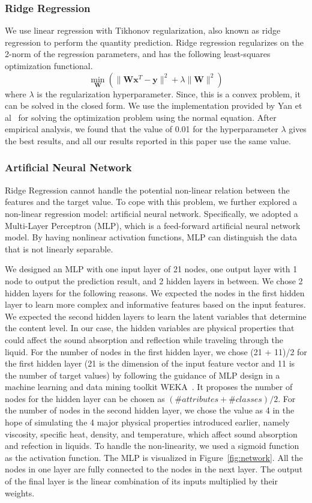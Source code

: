 \documentclass{article} %
\newcommand{\x}{\mathbf{x}}
\newcommand{\W}{\mathbf{W}}
\begin{document}
\subsubsection{Ridge Regression}
We use linear regression with Tikhonov regularization, also known as ridge regression to perform
the quantity prediction. Ridge regression regularizes on the 2-norm of the regression parameters,
and has the following least-squares optimization functional.
\[\min_\W\left(\lVert\W\x^T - \mathbf{y}\rVert^2 + \lambda\lVert\W\rVert^2\right)\]
where $\lambda$ is the regularization hyperparameter. Since, this is a convex problem, it can be solved in
the closed form. We use the implementation provided by Yan et al~\cite{yan2015improving} for solving the optimization problem using the normal equation. After empirical analysis, we found that the value of 0.01 for the hyperparameter $\lambda$ gives the best results, and all our results reported in this paper use the same value.

\subsubsection{Artificial Neural Network}
Ridge Regression cannot handle the potential non-linear relation between the features and the target value. To cope with this problem, we further explored a non-linear regression model: artificial neural network. Specifically, we adopted a Multi-Layer Perceptron (MLP), which is a feed-forward artificial neural network model. By having nonlinear activation functions, MLP can distinguish the data that is not linearly separable. 

We designed an MLP with one input layer of 21 nodes, one output layer with 1 node to output the prediction result, and 2 hidden layers in between. We chose 2 hidden layers for the following reasons. We expected the nodes in the first hidden layer to learn more complex and informative features based on the input features. We expected the second hidden layers to learn the latent variables that determine the content level. In our case, the hidden variables are physical properties that could affect the sound absorption and reflection while traveling through the liquid. For the number of nodes in the first hidden layer, we chose (21 + 11)/2 for the first hidden layer (21 is the dimension of the input feature vector and 11 is the number of target values) by following the guidance of MLP design in a machine learning and data mining toolkit WEKA~\cite{hall2009weka}. It proposes the number of nodes for the hidden layer can be chosen as $(\#attributes + \#classes) / 2$. For the number of nodes in the second hidden layer, we chose the value as 4 in the hope of simulating the 4 major physical properties introduced earlier, namely viscosity, specific heat, density, and temperature, which affect sound absorption and refection in liquids. To handle the non-linearity, we used a sigmoid function as the activation function. The MLP is visualized in Figure~\ref{fig:network}. All the nodes in one layer are fully connected to the nodes in the next layer. The output of the final layer is the linear combination of its inputs multiplied by their weights.
\end{document}
